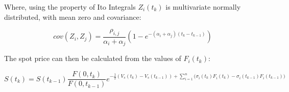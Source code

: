\documentclass{article}
\begin{document}
Where, using the property of Ito Integrals $Z_i(t_k)$ is multivariate normally 
distributed, with mean zero and covariance:

\begin{equation}
    cov(Z_i, Z_j) = \frac{\rho_{i, j}}{\alpha_i + \alpha_j}(1 - 
    e^{-(\alpha_i + \alpha_j)(t_k - t_{k-1})})
\end{equation}

The spot price can then be calculated from the values of $F_i(t_k)$:

\begin{equation}
    S(t_k) = S(t_{k-1}) \frac{F(0, t_k)}{F(0, t_{k-1})} e^{- \frac{1}{2} (V_s(t_k) - 
    V_s(t_{k-1})) + \sum_{i=1}^n \bigl(\sigma_i(t_k)F_i(t_k) - \sigma_i(t_{k-1})F_i(t_{k-1})\bigr)}
\end{equation}


\end{document}
